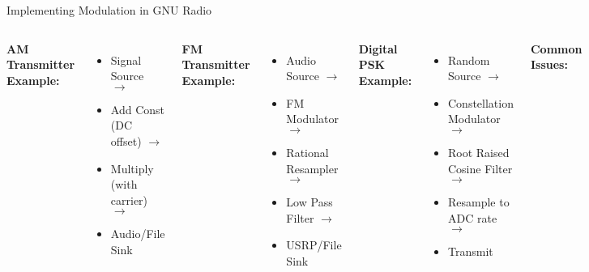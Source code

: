 \documentclass[aspectratio=169,11pt]{beamer}
\begin{document}
\begin{frame}{Implementing Modulation in GNU Radio}
\begin{columns}[T]
\textbf{AM Transmitter Example:}
\begin{itemize}
    \item Signal Source $\rightarrow$ 
    \item Add Const (DC offset) $\rightarrow$
    \item Multiply (with carrier) $\rightarrow$
    \item Audio/File Sink
\end{itemize}

\textbf{FM Transmitter Example:}
\begin{itemize}
    \item Audio Source $\rightarrow$
    \item FM Modulator $\rightarrow$
    \item Rational Resampler $\rightarrow$
    \item Low Pass Filter $\rightarrow$
    \item USRP/File Sink
\end{itemize}

\textbf{Digital PSK Example:}
\begin{itemize}
    \item Random Source $\rightarrow$
    \item Constellation Modulator $\rightarrow$
    \item Root Raised Cosine Filter $\rightarrow$
    \item Resample to ADC rate $\rightarrow$
    \item Transmit 
\end{itemize}

\textbf{Common Issues:}
\begin{itemize}
    \item Frequency offset
    \item Timing synchronization
    \item Phase ambiguity
    \item ISI (Inter-Symbol Interference)
\end{itemize}
\end{columns}
\end{frame}
\end{document}
